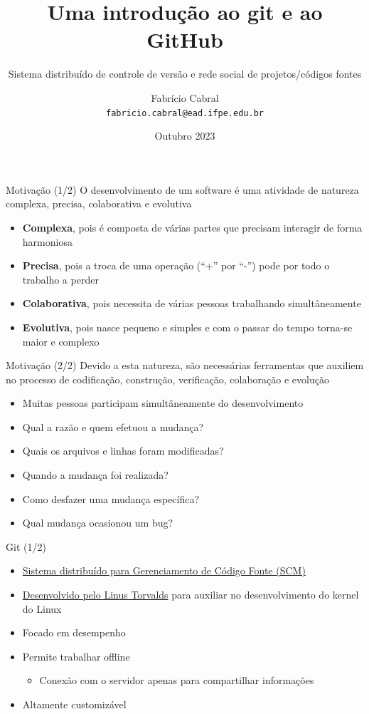\documentclass[14pt]{beamer}
\title{Uma introdução ao git e ao GitHub}
\subtitle{Sistema distribuído de controle de versão e rede social de 
projetos/códigos fontes}
\date{Outubro 2023}
\author[Fabrício Cabral]{
    Fabrício Cabral\texorpdfstring{\\\texttt{fabricio.cabral@ead.ifpe.edu.br}}{}
}
\institute{IFPE}
\begin{document}
\titlepage

\begin{frame}{Motivação (1/2)}
O desenvolvimento de um software é uma atividade de natureza complexa, precisa,
colaborativa e evolutiva
\begin{itemize}
    \item \textbf{Complexa}, pois é composta de várias partes que precisam
    interagir de forma harmoniosa
    \item \textbf{Precisa}, pois a troca de uma operação (``+'' por ``-'') pode
    por todo o trabalho a perder
    \item \textbf{Colaborativa}, pois necessita de várias pessoas trabalhando
    simultâneamente
    \item \textbf{Evolutiva}, pois nasce pequeno e simples e com o passar do
    tempo torna-se maior e complexo        
\end{itemize}
\end{frame}

\begin{frame}{Motivação (2/2)}
Devido a esta natureza, são necessárias ferramentas que auxiliem no processo de
codificação, construção, verificação, colaboração e evolução
\begin{itemize}
    \item Muitas pessoas participam simultâneamente do desenvolvimento
    \item Qual a razão e quem efetuou a mudança?
    \item Quais os arquivos e linhas foram modificadas?
    \item Quando a mudança foi realizada?
    \item Como desfazer uma mudança específica?
    \item Qual mudança ocasionou um bug?
\end{itemize}
\end{frame}

\begin{frame}{Git (1/2)}
    \begin{itemize}
        \item \href{https://git-scm.com}{Sistema distribuído para Gerenciamento
        de Código Fonte (SCM)}
        \item
        \href{https://www.atlassian.com/git/articles/10-years-of-git}{Desenvolvido
        pelo Linus Torvalds} para auxiliar no desenvolvimento do kernel do Linux
        \item Focado em desempenho
        \item Permite trabalhar offline
        \begin{itemize}
            \item Conexão com o servidor apenas para compartilhar informações
        \end{itemize}
        \item Altamente customizável
    \end{itemize}    
\end{frame}
\end{document}
